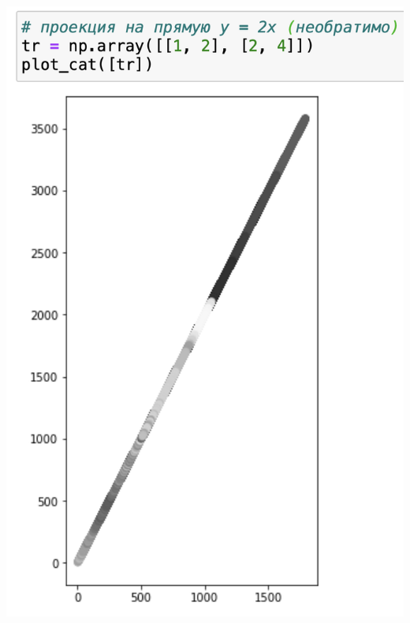 \documentclass[a4paper, 12pt]{article}
\begin{document}
\begin{spacing}{1.5}
\includegraphics[scale=0.45]{projection_y=2x.png}


\end{spacing}
\end{document}
